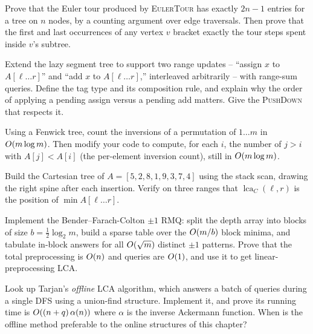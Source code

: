 \begin{exercise}
\label{ch23:ex-euler-len}
Prove that the Euler tour produced by \textsc{EulerTour} has exactly $2n-1$ entries for a tree
on $n$ nodes, by a counting argument over edge traversals. Then prove that the first and last
occurrences of any vertex $v$ bracket exactly the tour steps spent inside $v$'s subtree.
\end{exercise}

\begin{exercise}
\label{ch23:ex-lazy}
Extend the lazy segment tree to support two range updates -- ``assign $x$ to $A[\ell\ldots r]$''
and ``add $x$ to $A[\ell\ldots r]$,'' interleaved arbitrarily -- with range-sum queries.
Define the tag type and its composition rule, and explain why the order of applying a pending
assign versus a pending add matters. Give the \textsc{PushDown} that respects it.
\end{exercise}

\begin{exercise}
\label{ch23:ex-inv}
Using a Fenwick tree, count the inversions of a permutation of $1\ldots m$ in $O(m\log m)$.
Then modify your code to compute, for each $i$, the number of $j>i$ with $A[j]<A[i]$ (the
per-element inversion count), still in $O(m\log m)$.
\end{exercise}

\begin{exercise}
\label{ch23:ex-cartesian}
Build the Cartesian tree of $A=[5,2,8,1,9,3,7,4]$ using the stack scan, drawing the right
spine after each insertion. Verify on three ranges that $\operatorname{lca}_C(\ell,r)$ is the
position of $\min A[\ell\ldots r]$.
\end{exercise}

\begin{exercise}
\label{ch23:ex-pm1}
Implement the Bender--Farach-Colton $\pm1$ RMQ: split the depth array into blocks of size
$b=\tfrac12\log_2 m$, build a sparse table over the $O(m/b)$ block minima, and tabulate
in-block answers for all $O(\sqrt m)$ distinct $\pm1$ patterns. Prove that the total
preprocessing is $O(n)$ and queries are $O(1)$, and use it to get linear-preprocessing
LCA.
\end{exercise}

\begin{exercise}
\label{ch23:ex-tarjan}
Look up Tarjan's \emph{offline} LCA algorithm, which answers a batch of queries during a
single DFS using a union-find structure. Implement it, and prove its running time is
$O((n+q)\,\alpha(n))$ where $\alpha$ is the inverse Ackermann function. When is the offline
method preferable to the online structures of this chapter?
\end{exercise}

